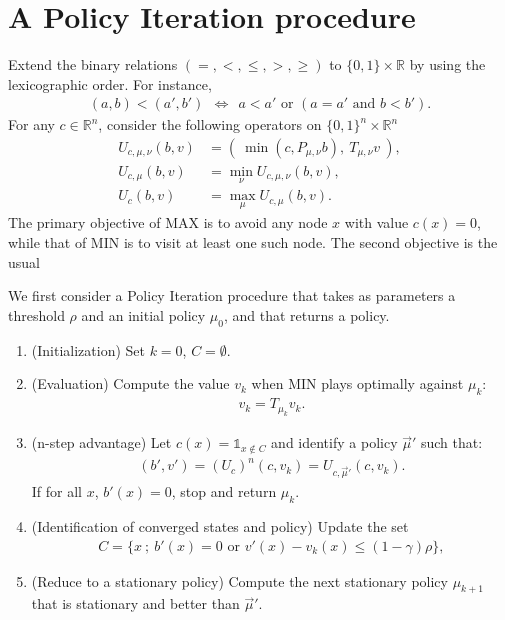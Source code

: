 \documentclass{article}
\def\R{\mathds R}
\def\1{{\mathds 1}}
\begin{document}
\section{A Policy Iteration procedure}

Extend the binary relations $(=,<,\le,>,\ge)$ to $\{0,1\}\times \R$ by using the lexicographic order. For instance,
\begin{align}
  (a,b) < (a',b') ~~\Leftrightarrow~~ a<a' \mbox{ or }(a=a' \mbox{ and }b<b').
\end{align}
For any $c \in \R^n$, consider the following operators on $\{0,1\}^n \times \R^n$
\begin{align}
  U_{c,\mu,\nu} (b,v) &= (~ \min(c, P_{\mu,\nu}b),~ T_{\mu,\nu}v ~),\\
  U_{c,\mu} (b,v) & = \min_{\nu} U_{c,\mu,\nu}(b,v), \\
  U_c(b,v) & = \max_{\mu} U_{c,\mu} (b,v).
\end{align}
The primary objective of MAX is to avoid any node $x$ with value $c(x)=0$, while that of MIN is to visit at least one such node. The second objective is the usual 


We first consider a Policy Iteration procedure that takes as parameters a threshold $\rho$ and an initial policy $\mu_0$, and that returns a policy.
  \begin{enumerate}
  \item (Initialization) Set $k=0$, $C=\emptyset$.
  \item (Evaluation) Compute the value $v_k$ when MIN plays optimally against $\mu_k$:
    \begin{align}
      v_k = T_{\mu_k} v_k.
    \end{align}
  \item (n-step advantage) Let $c(x)=\1_{x \not\in C}$ and identify a policy $\vec\mu'$ such that:
    \begin{align}
      (b', v') = (U_c)^n (c,v_k) = U_{c,\vec\mu'} (c,v_k).
    \end{align}
    If for all $x$, $b'(x)=0$, stop and return $\mu_k$.
  \item (Identification of converged states and policy) Update the set
      \begin{align}
        C = \{ x ~;~ b'(x)=0 \mbox{ or }v'(x)-v_k(x) \le (1-\gamma)\rho \},
      \end{align}
    \item (Reduce to a stationary policy) Compute the next stationary policy $\mu_{k+1}$ that is stationary and better than $\vec\mu'$.
  \end{enumerate}
\end{document}
